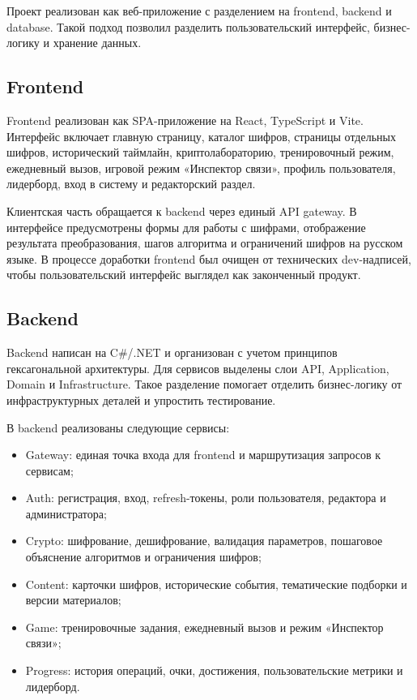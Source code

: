 \documentclass[14pt,a4paper]{extarticle}
\begin{document}
Проект реализован как веб-приложение с разделением на frontend, backend и database. Такой подход позволил разделить пользовательский интерфейс, бизнес-логику и хранение данных.

\subsection{Frontend}

Frontend реализован как SPA-приложение на React, TypeScript и Vite. Интерфейс включает главную страницу, каталог шифров, страницы отдельных шифров, исторический таймлайн, криптолабораторию, тренировочный режим, ежедневный вызов, игровой режим «Инспектор связи», профиль пользователя, лидерборд, вход в систему и редакторский раздел.

Клиентская часть обращается к backend через единый API gateway. В интерфейсе предусмотрены формы для работы с шифрами, отображение результата преобразования, шагов алгоритма и ограничений шифров на русском языке. В процессе доработки frontend был очищен от технических dev-надписей, чтобы пользовательский интерфейс выглядел как законченный продукт.

\subsection{Backend}

Backend написан на C\#/.NET и организован с учетом принципов гексагональной архитектуры. Для сервисов выделены слои API, Application, Domain и Infrastructure. Такое разделение помогает отделить бизнес-логику от инфраструктурных деталей и упростить тестирование.

В backend реализованы следующие сервисы:

\begin{itemize}
  \item Gateway: единая точка входа для frontend и маршрутизация запросов к сервисам;
  \item Auth: регистрация, вход, refresh-токены, роли пользователя, редактора и администратора;
  \item Crypto: шифрование, дешифрование, валидация параметров, пошаговое объяснение алгоритмов и ограничения шифров;
  \item Content: карточки шифров, исторические события, тематические подборки и версии материалов;
  \item Game: тренировочные задания, ежедневный вызов и режим «Инспектор связи»;
  \item Progress: история операций, очки, достижения, пользовательские метрики и лидерборд.
\end{itemize}
\end{document}
